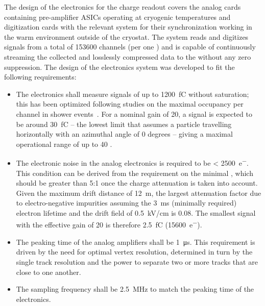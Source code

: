 The design of the electronics for the charge readout covers the analog  cards containing pre-amplifier ASICs operating at cryogenic temperatures and digitization cards with the relevant system for their synchronization working in the warm environment outside of the cryostat. The system %
reads and digitizes signals from a total of \num{153600} channels (per one ) and is capable of continuously streaming the collected and losslessly compressed data to the  without any zero suppression. 
The design of the  electronics system was developed to fit the following requirements:
\begin{itemize}
\item{The  electronics %
shall measure signals of up to \SI{1200}{\femto\coulomb} without saturation; this has been optimized following  studies on the maximal occupancy per channel in shower events~\cite{WA105_TDR}. For a nominal  gain of \num{20}, a  signal is expected to be around \SI{30}{fC} -- the lowest limit that assumes a particle travelling horizontally with an azimuthal angle of \num{0} degrees -- giving %
a maximal operational range of up to \num{40} .}

\item{The electronic noise in the  analog electronics is required to be \SI{< 2500}{e^{-}}. This condition can be derived from the requirement on the minimal , which should be greater than \num{5}:\num{1} once the charge attenuation is taken into account. Given the maximum drift distance of \SI{12}{\meter}, the largest attenuation factor due to electro-negative impurities assuming the \SI{3}{\milli\second} (minimally required) electron lifetime and the drift field of \SI{0.5}{\kilo\volt/\cm} is \num{0.08}. The smallest  signal with the  effective gain of \num{20} is therefore \SI{2.5}{\femto\coulomb} (\SI{15600}{e^{-}}).}

\item{The peaking time of the  analog amplifiers %
shall be \SI{1}{\micro\second}. This requirement is driven by the need for optimal vertex resolution, determined in turn by the single track resolution and the power to separate two or more tracks that are close to one another.}

\item{The sampling frequency %
shall be \SI{2.5}{\MHz} to match the peaking time of the  electronics.}


\end{itemize}
